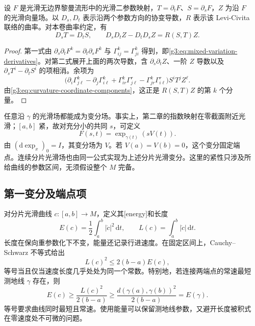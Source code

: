\begin{proposition}\label{g3:prop:variation-commutation}
	设 \(F\) 是光滑无边界黎曼流形中的光滑二参数映射，\(T=\partial_tF\)、\(S=\partial_sF\)，\(Z\) 为沿 \(F\) 的光滑向量场。以 \(D_s,D_t\) 表示沿两个参数方向的协变导数，\(R\) 表示该 Levi-Civita 联络的曲率。对本卷曲率约定，有
	\begin{equation}\label{g3:eq:variation-commutation}
		D_sT=D_tS,\qquad D_sD_tZ-D_tD_sZ=R(S,T)Z.
	\end{equation}
\end{proposition}
\begin{proof}
	第一式由 \(\partial_s\partial_tF^k=\partial_t\partial_sF^k\) 与 \(\Gamma^k_{ij}=\Gamma^k_{ji}\) 得到，即\eqref{g3:eq:mixed-variation-derivatives}。对第二式展开上面的两次导数，含 \(\partial_s\partial_tZ\)、一阶 \(Z\) 导数以及 \(\partial_sT^i-\partial_tS^i\) 的项相消。余项为
	\[
		\bigl(\partial_i\Gamma^k_{j\ell}-\partial_j\Gamma^k_{i\ell}
		+\Gamma^k_{ir}\Gamma^r_{j\ell}-\Gamma^k_{jr}\Gamma^r_{i\ell}\bigr)
		S^iT^jZ^\ell.
	\]
	由\eqref{g3:eq:curvature-coordinate-components}，这正是 \(R(S,T)Z\) 的第 \(k\) 个分量。
\end{proof}

任意沿 \(\gamma\) 的光滑场都能成为变分场。事实上，第二章的指数映射在零截面附近光滑；\([a,b]\) 紧，故对充分小的共同 \(s\)，可定义
\begin{equation}\label{g3:eq:exponential-field-variation}
	F(s,t)=\exp_{\gamma(t)}(sV(t)).
\end{equation}
由 \((\mathrm d\exp_x)_0=I\)，其变分场为 \(V\)。若 \(V(a)=V(b)=0\)，这个变分固定端点。连续分片光滑场也由同一公式实现为上述分片光滑变分。这里的紧性只涉及所给曲线的参数区间，无须假设整个 \(M\) 完备。

\subsection{第一变分及端点项}
\label{g3:subsec:0601:02}

对分片光滑曲线 \(c:[a,b]\to M\)，定义其[energy]和长度
\begin{equation}\label{g3:eq:curve-energy-length}
	E(c)=\frac12\int_a^b|\dot c|^2\,\mathrm dt,
	\qquad L(c)=\int_a^b|\dot c|\,\mathrm dt.
\end{equation}
长度在保向重参数化下不变，能量还记录行进速度。在固定区间上，Cauchy--Schwarz 不等式给出
\begin{equation}\label{g3:eq:energy-length-inequality}
	L(c)^2\le2(b-a)E(c),
\end{equation}
等号当且仅当速度长度几乎处处为同一个常数。特别地，若连接两端点的常速最短测地线 \(\gamma\) 存在，则
\[
	E(c)\ge \frac{L(c)^2}{2(b-a)}
	\ge\frac{d(\gamma(a),\gamma(b))^2}{2(b-a)}=E(\gamma).
\]
等号要求曲线同时最短且常速。使用能量可以保留测地线参数，又避开长度被积式在零速度处不可微的问题。

